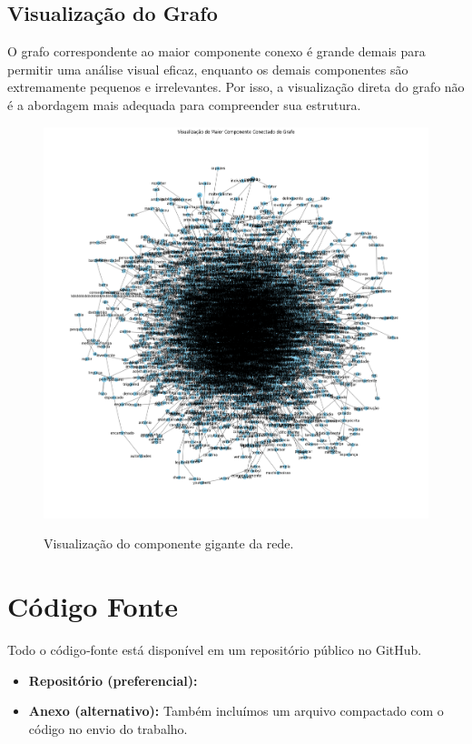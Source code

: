 \documentclass[12pt, a4paper]{article}
\begin{document}
\subsection{Visualização do Grafo}

 O grafo correspondente ao maior componente conexo é grande demais para permitir uma análise visual eficaz, enquanto os demais componentes são extremamente pequenos e irrelevantes. Por isso, a visualização direta do grafo não é a abordagem mais adequada para compreender sua estrutura.
\begin{figure}[H]
    \centering
    \includegraphics[width=\textwidth]{grafo.png}
    \label{fig:visualizacao}
    \caption{Visualização do componente gigante da rede.}
\end{figure}


\newpage
\section{Código Fonte}

Todo o código‑fonte está disponível em um repositório público no GitHub.

\begin{itemize}
    \item \textbf{Repositório (preferencial):} \href{https://github.com/LorenaSouzaMoreiraa/RedesComplexas-TpIntermediario}{}
    \item \textbf{Anexo (alternativo):} Também incluímos um arquivo compactado com o código no envio do trabalho.
\end{itemize}
\end{document}
